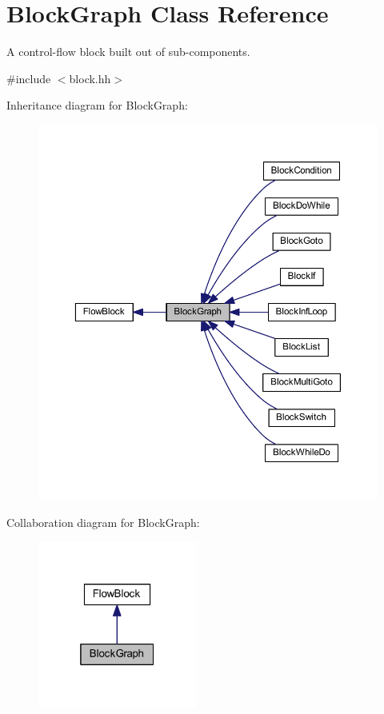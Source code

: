 \hypertarget{class_block_graph}{}\section{Block\+Graph Class Reference}
\label{class_block_graph}


A control-\/flow block built out of sub-\/components.  




{\ttfamily \#include $<$block.\+hh$>$}



Inheritance diagram for Block\+Graph\+:
\nopagebreak
\begin{figure}[H]
\begin{center}
\leavevmode
\includegraphics[width=350pt]{class_block_graph__inherit__graph}
\end{center}
\end{figure}


Collaboration diagram for Block\+Graph\+:
\nopagebreak
\begin{figure}[H]
\begin{center}
\leavevmode
\includegraphics[width=148pt]{class_block_graph__coll__graph}
\end{center}
\end{figure}
